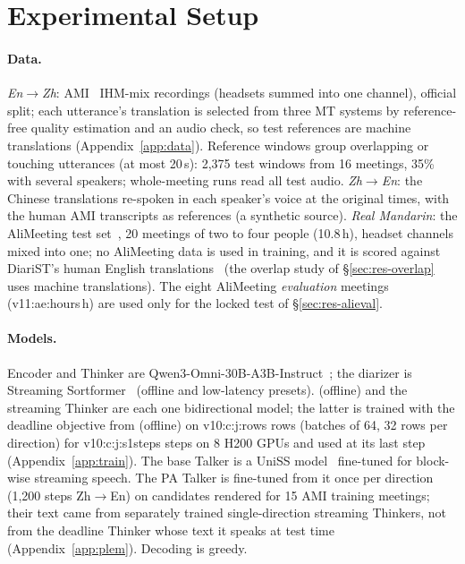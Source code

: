 \section{Experimental Setup}
\label{sec:setup}



\paragraph{Data.} \emph{En$\rightarrow$Zh}: AMI~\citep{carletta2005ami} IHM-mix recordings (headsets summed into one
channel), official split; each utterance's translation is selected from three MT systems by reference-free quality
estimation and an audio check, so test references are machine translations (Appendix~\ref{app:data}). Reference
windows group overlapping or touching utterances (at most 20\,s): 2{,}375 test windows from 16 meetings, 35\% with
several speakers; whole-meeting runs read all test audio. \emph{Zh$\rightarrow$En}: the Chinese translations
re-spoken in each speaker's voice at the original times, with the human AMI transcripts as references (a synthetic
source). \emph{Real Mandarin}: the AliMeeting test
set~\citep{yu2022m2met}, 20 meetings of two to four people (10.8\,h), headset channels mixed into one; no AliMeeting
data is used in training, and it is scored against DiariST's human English translations~\citep{yang2024diarist} (the
overlap study of \S\ref{sec:res-overlap} uses machine translations).\ifAliEval{} The eight AliMeeting
\emph{evaluation} meetings (\num{v11:ae:hours}\,h) are used only for the locked test of \S\ref{sec:res-alieval}.\fi

\paragraph{Models.} Encoder and Thinker are Qwen3-Omni-30B-A3B-Instruct~\citep{xu2025qwen3omni}; the diarizer is
Streaming Sortformer~\citep{medennikov2025streaming} (offline and low-latency presets). \sys{} (offline) and the
streaming Thinker are each one bidirectional model; the latter is trained with the deadline objective from \sys{}
(offline) on \num{v10:c:j:rows} rows (batches of 64, 32 rows per direction) for \num{v10:c:j:s1steps} steps on 8 H200
GPUs and used at its last step (Appendix~\ref{app:train}). The base Talker is a UniSS model~\citep{uniss2025}
fine-tuned for block-wise streaming speech. The PA Talker is fine-tuned from it once per direction (1{,}200 steps
Zh$\rightarrow$En) on candidates rendered for 15 AMI training meetings; their text came from separately trained
single-direction streaming Thinkers, not from the deadline Thinker whose text it speaks at test time
(Appendix~\ref{app:plem}). Decoding is greedy.

